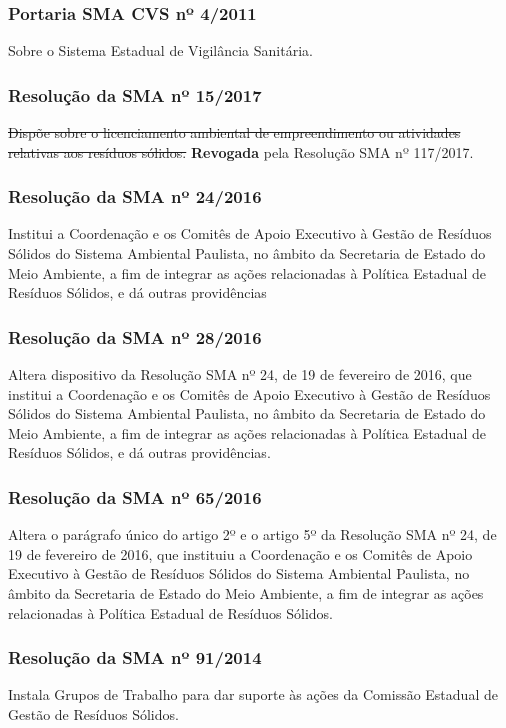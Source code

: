 \begin{subapend}
\begin{subsubapend}
		\subsubsection{Portaria SMA CVS nº 4/2011}
		Sobre o Sistema Estadual de Vigilância Sanitária.
		\subsubsection{Resolução da SMA nº 15/2017}
		\sout{Dispõe sobre o licenciamento ambiental de empreendimento ou atividades relativas aos resíduos sólidos.} \textbf{Revogada} pela Resolução SMA nº 117/2017.
		\subsubsection{Resolução da SMA nº 24/2016}
		Institui a Coordenação e os Comitês de Apoio Executivo à Gestão de Resíduos Sólidos do Sistema Ambiental Paulista, no âmbito da Secretaria de Estado do Meio Ambiente, a fim de integrar as ações relacionadas à Política Estadual de Resíduos Sólidos, e dá outras providências
		\subsubsection{Resolução da SMA nº 28/2016}
		Altera dispositivo da Resolução SMA nº 24, de 19 de fevereiro de 2016, que institui a Coordenação e os Comitês de Apoio Executivo à Gestão de Resíduos Sólidos do Sistema Ambiental Paulista, no âmbito da Secretaria de Estado do Meio Ambiente, a fim de integrar as ações relacionadas à Política Estadual de Resíduos Sólidos, e dá outras providências.
		\subsubsection{Resolução da SMA nº 65/2016}
		Altera o parágrafo único do artigo 2º e o artigo 5º da Resolução SMA nº 24, de 19 de fevereiro de 2016, que instituiu a Coordenação e os Comitês de Apoio Executivo à Gestão de Resíduos Sólidos do Sistema Ambiental Paulista, no âmbito da Secretaria de Estado do Meio Ambiente, a fim de integrar as ações relacionadas à Política Estadual de Resíduos Sólidos.
		\subsubsection{Resolução da SMA nº 91/2014}
		Instala Grupos de Trabalho para dar suporte às ações da Comissão Estadual de Gestão de Resíduos Sólidos.
	\end{subsubapend}
\end{subapend}

